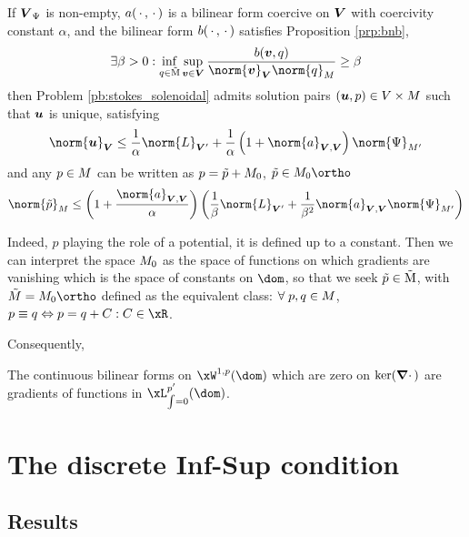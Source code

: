 \begin{thrm}[Existence]
If $\boldsymbol{{V}}_\Psi$ is non-empty, $a(\,{\mathbf\cdot}\,,\,{\mathbf\cdot}\,)$ is a bilinear form coercive on $\boldsymbol{{V}}$ with coercivity constant $\alpha$, and the bilinear form $b(\,{\mathbf\cdot}\,,\,{\mathbf\cdot}\,)$ satisfies Proposition \eqref{prp:bnb}, \ie
\begin{equation*}
\exists\beta>0 : \inf_{q\in\xMz}\sup_{\vv\in\xVd} \dfrac{b(\vv,q)}{\norm{\vv}_{\xVd}\norm{q}_{\xM}} \geq \beta
\end{equation*}
then Problem \eqref{pb:stokes_solenoidal} admits solution pairs $({{\boldsymbol u}},p)\in{V}\times{M}$ such that ${{\boldsymbol u}}$ is unique, satisfying
\begin{equation*}
\norm{\uu}_{\xVd} \leq \dfrac{1}{\alpha} \norm{L}_{\xVd'} + \dfrac{1}{\alpha}\left(1 + \norm{a}_{\xVd,\xVd} \right) \norm{\Psi}_{\xM'}
\end{equation*}
and any $p \in {M}$ can be written as $p = \tilde p + {{M}}_0$, $\tilde p\in\xMker\ortho$
\begin{equation*}
\norm{\tilde p}_{\xM} \leq \left(1 + \dfrac{\norm{a}_{\xVd,\xVd}}{\alpha} \right)
\left(\dfrac{1}{\beta} \norm{L}_{\xVd'} + \dfrac{1}{\beta^2}\norm{a}_{\xVd,\xVd}\norm{\Psi}_{\xM'}\right)
\end{equation*}
\end{thrm}

\medskip
Indeed, $p$ playing the role of a potential, it is defined up to a constant.
Then we can interpret the space ${{M}}_0$ as the space of functions on which gradients are vanishing which is the space of constants on $\dom$, so that we seek $\tilde p\in{\mathrm{\tilde M}}$, with $\tilde\xM = \xMker\ortho$ defined as the equivalent class: ${\forall\;} p, q \in {M}$, $p \equiv q \Leftrightarrow p = q + C : C\in\xR$.

\medskip
Consequently,

\medskip
\begin{thrm} The continuous bilinear forms on $\xW^{1,p}(\dom)$ which are zero on $\ker({\boldsymbol\nabla\cdot\,})$ are gradients of functions in $\xL^{p'}_{\int = 0}(\dom)$.
\end{thrm}

\section{The discrete Inf-Sup condition}

\subsection{Results}

